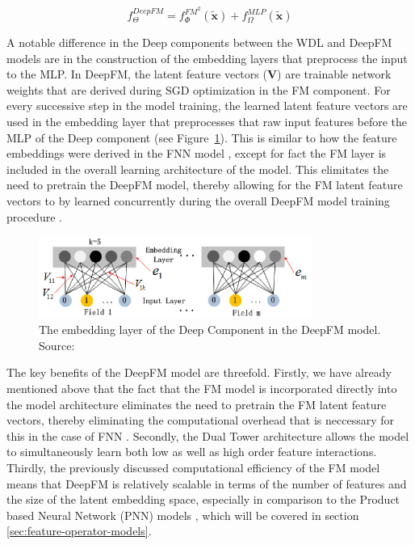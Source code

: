 \documentclass{mldsmsc}
\begin{document}
\begin{equation}\label{eqn:deepfm}
    f_{\Theta}^{DeepFM} = f_{\Phi}^{FM^2}(\tilde{\mathbf{x}}) + f_{\Omega}^{MLP}(\tilde{\mathbf{x}})
\end{equation}

A notable difference
in the Deep components between the WDL and DeepFM models are in the construction of the
embedding layers that preprocess the input to the MLP. In DeepFM, the latent feature vectors
($\mathbf{V}$) are trainable network weights that are derived during SGD optimization in the FM
component. For every successive step in the model training, the learned latent feature vectors
are used in the embedding layer that preprocesses that raw input features before the MLP of 
the Deep component (see Figure~\ref{fig:deepfm-embedding}). This is similar to how the feature embeddings were derived in the FNN model
\citep{RefWorks:zhang2016deep}, except for fact the FM layer is included in the overall learning
architecture of the model. This elimitates the need to pretrain the DeepFM model, thereby allowing
for the FM latent feature vectors to by learned concurrently during the overall DeepFM model
training procedure \citep{RefWorks:guo2017deepfm:}.

\begin{figure}[h]
    \centering
    \includegraphics[width=0.8\textwidth]{../figures/deepfm_embedding.png}
    \caption{The embedding layer of the Deep Component in the DeepFM model. Source: \citep{RefWorks:guo2017deepfm:}}
    \label{fig:deepfm-embedding}
\end{figure}

The key benefits of the DeepFM model are threefold. Firstly, we have already mentioned above
that the fact that the FM model is incorporated directly into the model architecture eliminates
the need to pretrain the FM latent feature vectors, thereby eliminating the computational overhead
that is neccessary for this in the case of FNN \citep{RefWorks:zhang2016deep}. Secondly,
the Dual Tower architecture allows the model to simultaneously learn both low as well as high
order feature interactions. Thirdly, the previously discussed computational efficiency of the
FM model means that DeepFM is relatively scalable in terms of the number of features and the size of
the latent embedding space, especially in comparison to the Product based Neural Network
(PNN) models \citep{RefWorks:qu2016product-based}, which will be covered in section \ref{sec:feature-operator-models}.
\end{document}
